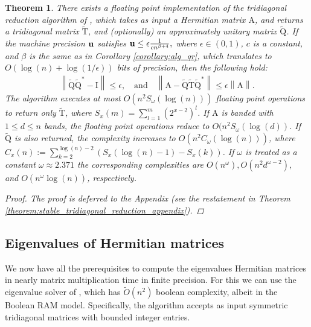 \documentclass{article}
\newcommand{\lnorm}{\left\|}
\newcommand{\rnorm}{\right\|}
\newcommand{\lpar}{\left(}
\newcommand{\rpar}{\right)}
\newtheorem{theorem}{Theorem}[section]
\newcommand\matA{\boldsymbol{\mathrm{A}}}
\newcommand\matI{\boldsymbol{\mathrm{I}}}
\newcommand\matQtilde{\widetilde{\boldsymbol{\mathrm{Q}}}}
\newcommand\matTtilde{\widetilde{\boldsymbol{\mathrm{T}}}}
\newcommand{\umach}{\textbf{\textup{u}}}
\newcommand{\cmm}{\beta}
\begin{document}
\begin{theorem}
    \label{theorem:stable_tridiagonal_reduction}
    There exists a floating point implementation of the tridiagonal reduction algorithm of \cite{schonhage1972unitare}, which takes as input a Hermitian matrix $\matA$, and returns a tridiagonal matrix $\matTtilde$, and (optionally) an approximately unitary matrix $\matQtilde$. If the machine precision $\umach$ satisfies
    $
        \umach \leq \epsilon\frac{1}{cn^{\beta+4}},
    $
    where $\epsilon\in(0,1)$, $c$ is a constant, and $\cmm$ is the same as in Corollary \ref{corollary:alg_qr}, which translates to $O(\log(n)+\log(1/\epsilon))$ bits of precision, then the following hold:
    \begin{align*}
        \lnorm \matQtilde\matQtilde^*-\matI\rnorm \leq \epsilon,
        \quad
        \text{and}
        \quad
        \lnorm \matA - \matQtilde\matTtilde\matQtilde^* \rnorm \leq \epsilon \lnorm \matA \rnorm.
    \end{align*}
    The algorithm executes at most $O\lpar
                    n^2 S_{\omega}(\log(n))
    \rpar$ floating point operations to return only $\matTtilde$, where $S_x(m)=\sum_{l=1}^m (2^{x-2})^l$.
    If $\matA$ is banded with $1\leq d\leq n$ bands, the floating point operations reduce to $O(n^2 S_{\omega}(\log(d))$.
    If $\matQtilde$ is also returned, the complexity increases to $O(n^2C_{\omega}(\log(n)))$, 
    where $C_{x}(n) := 
    \sum_{k=2}^{\log(n)-2}
    \lpar
        S_{x}(\log(n)-1) - S_{x}(k)
    \rpar$. If $\omega$ is treated as a constant $\omega\approx 2.371$ the corresponding complexities are $O(n^{\omega}), O(n^2d^{\omega-2}),$ and $O(n^{\omega}\log(n))$, respectively.
    \begin{proof}
        The proof is deferred to the Appendix (see the restatement in Theorem \ref{theorem:stable_tridiagonal_reduction_appendix}).
    \end{proof}
\end{theorem}

\subsection{Eigenvalues of Hermitian matrices}
\label{section:hermitian_eigenvalues}
We now have all the prerequisites to compute  the eigenvalues Hermitian matrices in nearly matrix multiplication time in finite precision.
For this we can use the eigenvalue solver of \cite{bini1991parallel}, which has $\widetilde O(n^2)$ boolean complexity, albeit in the Boolean RAM model. Specifically, the algorithm accepts as input symmetric tridiagonal matrices with bounded integer entries. 
\end{document}
